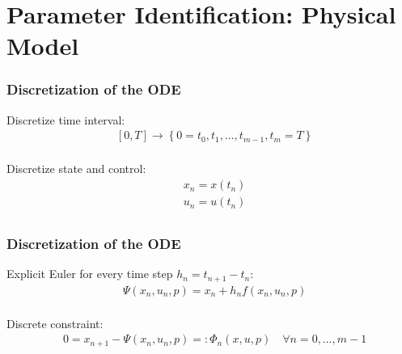 \section{Parameter Identification: Physical Model}

\begin{frame}
	\frametitle{Discretization of the ODE}
	
	Discretize time interval:
	\begin{align*}
	  &[0,T] \rightarrow \left\{ 0=t_0, t_1, \dots, t_{m-1}, t_{m}=T 
\right\} \\
	\end{align*}
	
	Discretize state and control:
	\begin{align*}
	  &x_n = x(t_n) \\
   &u_n = u(t_n) \\
	\end{align*}
	
\end{frame}

\begin{frame}
	
	\frametitle{Discretization of the ODE}
	
	Explicit Euler for every time step $h_n=t_{n+1}-t_n$:
	\begin{align*}
        &\Psi(x_n,u_n,p) = x_n + h_n f(x_n,u_n,p)  \\
	\end{align*}
	
	Discrete constraint:
	\begin{align*}
        &0 = x_{n+1} - \Psi(x_n,u_n,p) =: \Phi_n(x,u,p) \quad \forall n = 0,\ldots,m-1
	\end{align*}

	
\end{frame}

